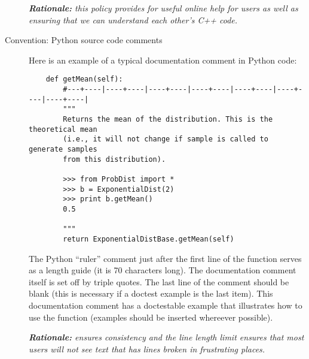 \documentclass[10pt]{article}
\begin{document}
\begin{description}
{\em {\bfseries Rationale:} this policy provides for useful online help for users as well as ensuring that we can understand each other's C++ code.}

\item[Convention: Python source code comments] Here is an example of a typical documentation comment in Python code:
\begin{verbatim}
    def getMean(self):
        #---+----|----+----|----+----|----+----|----+----|----+----|----+----|
        """
        Returns the mean of the distribution. This is the theoretical mean
        (i.e., it will not change if sample is called to generate samples
        from this distribution).

        >>> from ProbDist import *
        >>> b = ExponentialDist(2)
        >>> print b.getMean()
        0.5

        """
        return ExponentialDistBase.getMean(self)
\end{verbatim}
The Python ``ruler'' comment just after the first line of the function serves as a length guide (it is 70 characters long). The documentation comment itself is set off by triple quotes. The last line of the comment should be blank (this is necessary if a doctest example is the last item). This documentation comment has a doctestable example that illustrates how to use the function (examples should be inserted whereever possible).

 {\em {\bfseries Rationale:} ensures consistency and the line length limit ensures that most users will not see text that has lines broken in frustrating places.}
\end{description}

%
%

%
\end{document}
